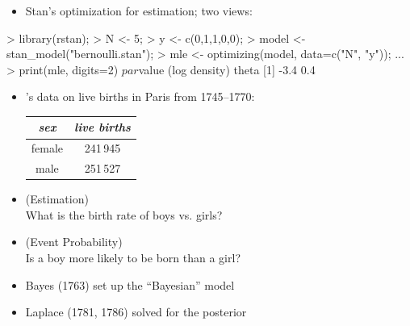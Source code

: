 \documentclass[10pt]{report}
\begin{document}
%
\begin{itemize}
\item Stan's optimization for estimation; two views:
\end{itemize}
\vspace*{-6pt}
\begin{stancode}
> library(rstan);
> N <- 5;
> y <- c(0,1,1,0,0);
> model <- stan_model("bernoulli.stan");
> mle <- optimizing(model, data=c("N", "y"));
...
> print(mle, digits=2)
$par              $value  (log density)
theta             [1] -3.4
  0.4
\end{stancode}





\begin{itemize}
\item {}'s data on live births in Paris from 1745--1770:
\vspace*{-4pt}
\begin{center}\small
\begin{tabular}{c|c}
{\slshape sex} & {\slshape live births}
\\ \hline
female & 241\,945
\\
male & 251\,527
\end{tabular}
\end{center}
\item {} (Estimation)
\\
What is the birth rate of boys vs. girls?

\item {} (Event Probability)
\\
Is a boy more likely to be born than a girl?
%
\item Bayes (1763) set up the ``Bayesian'' model
\item Laplace (1781, 1786) solved for the posterior
\end{itemize}
\end{document}

